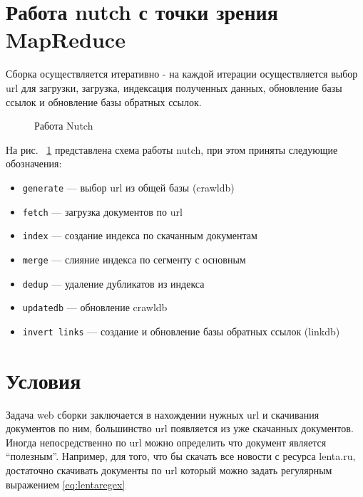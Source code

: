 \section*{Работа nutch с точки зрения MapReduce}
Сборка осуществляется итеративно - на каждой итерации осуществляется выбор url для загрузки, загрузка, индексация полученных данных, обновление базы ссылок и обновление базы обратных ссылок. 
  \begin{figure}[h]
    \caption{Работа Nutch\cite{pimenov}}
    \label{ris:nutch}
  \end{figure}

На рис. ~\ref{ris:nutch} представлена схема работы nutch, при этом приняты следующие обозначения: 
\begin{itemize}
 \item \texttt{generate} --- выбор url из общей базы (crawldb)
 \item \texttt{fetch} --- загрузка документов по url
 \item \texttt{index} --- создание индекса по скачанным документам
 \item \texttt{merge} --- слияние индекса по сегменту с основным
 \item \texttt{dedup} --- удаление дубликатов из индекса
 \item \texttt{updatedb} --- обновление crawldb
 \item \texttt{invert links} --- создание и обновление базы обратных ссылок (linkdb)

\end{itemize}


\section*{Условия}
Задача web сборки заключается в нахождении нужных url и скачивания документов по ним, большинство url появляется из уже скачанных документов.
Иногда непосредственно по url можно определить что документ является ``полезным''. Например, для того, что бы скачать все новости с ресурса lenta.ru, достаточно скачивать документы по url который можно задать регулярным выражением \ref{eq:lentaregex}

